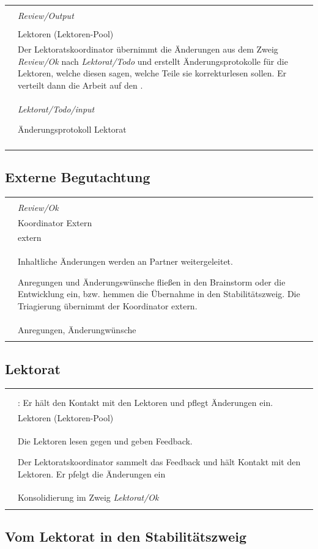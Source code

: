 \documentclass[
ngerman,
paper=a4,
asymmetric,
fontsize=10pt,
draft=false,
numbers=noenddot,
bibtotocnumbered,
footnotes=multiple,
toc=flat,
]{scrbook}
\newcommand{\Branch}[1]{\emph{#1}}
\newcommand{\Entwicklunsgprozessschritt}[8]
{
\noindent\begin{tabularx}{\linewidth}{lX}
\addlinespace\toprule\addlinespace
\multicolumn{2}{c}{Prozessschritt:
\TabHeading{\color{DefaultA}#1}}
\\\addlinespace\midrule\addlinespace \noindent\TabSub{Input} & #4
\\\addlinespace
\TabSub{Verantwortlicher} & #6
\\\addlinespace
\TabSub{Mitwirkende} & #7
\\\addlinespace
\TabSub{Tätigkeit} & #8
\\\addlinespace
\TabSub{Output} & #5
\\\addlinespace\bottomrule\addlinespace
\end{tabularx}
}
\begin{document}
\Entwicklunsgprozessschritt
{%
Review $\rightarrow$ Lektorat und externe Begutachtung}
{%
}
{%
}
{%
\Branch{Review/Output}
}
{%
\Branch{Lektorat/Todo/input}

Änderungsprotokoll Lektorat}
{%
\T{Lektoratskoordinator}}
{%
Lektoren (Lektoren-Pool)}
{%
Der Lektoratskoordinator übernimmt die Änderungen aus dem
Zweig \Branch{Review/Ok} nach \Branch{Lektorat/Todo} und erstellt
Änderungsprotokolle für die Lektoren, welche diesen sagen,
welche Teile sie korrekturlesen sollen. Er verteilt dann die
Arbeit auf den \I{Lektorenpool}.}

\subsection{Externe Begutachtung}




\Entwicklunsgprozessschritt
{%
Externe Begutachtung}
{%
}
{%
}
{%
\Branch{Review/Ok}}
{%
Anregungen, Änderungwünsche}
{%
Koordinator Extern}
{%
extern}
{%
Inhaltliche Änderungen werden an Partner weitergeleitet.

Anregungen und Änderungswünsche fließen in den Brainstorm
oder die Entwicklung ein, bzw. hemmen die Übernahme in den
Stabilitätszweig. Die Triagierung übernimmt der Koordinator
extern.}



\subsection{Lektorat}


\Entwicklunsgprozessschritt
{%
Lektorat}
{%
}
{%
}
{%
}
{%
Konsolidierung im Zweig \Branch{Lektorat/Ok}}
{%
\T{Lektoratskoordinator}: Er hält den Kontakt mit
den Lektoren und pflegt Änderungen ein.}
{%
Lektoren (Lektoren-Pool)}
{%
Die Lektoren lesen gegen und geben Feedback.

Der Lektoratskoordinator sammelt das Feedback und hält
Kontakt mit den Lektoren. Er pfelgt die Änderungen ein}

\subsection{Vom Lektorat in den Stabilitätszweig}
\end{document}
